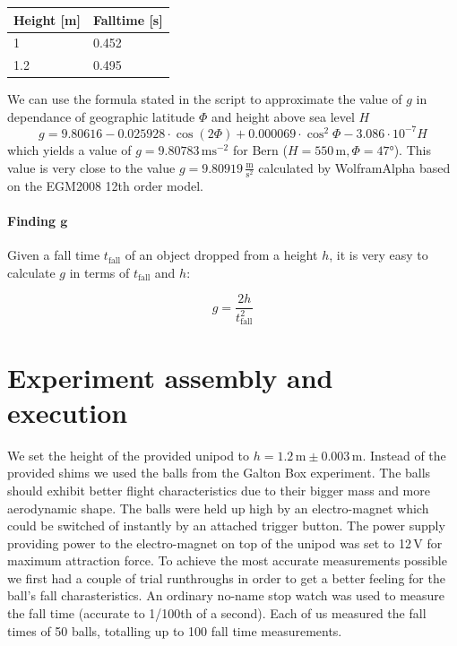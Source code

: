 \documentclass{scrreprt}
\newcommand{\unit}[1]{\ensuremath{\, \mathrm{#1}}}
\begin{document}
\begin{center}
    \begin{tabular}{|l||l|}
    \hline
    Height [m] & Falltime [s]\\ \hline \hline
    1 & 0.452\\ \hline
    1.2 & 0.495\\ \hline
    \end{tabular}
\end{center}

We can use the formula stated in the script \cite[p. 54, f. 4.2]{physcript13} to approximate the value of $g$ in dependance of geographic latitude $\Phi$ and height above sea level $H$
\begin{equation} 
g = 9.80616 - 0.025928 \cdot \cos(2\Phi) + 0 .000069 \cdot \cos^{2} \Phi - 3.086 \cdot 10^{-7} H
\end{equation}
which yields a value of $g = 9.80783\unit{ms^{-2}}$ for Bern ($H = 550\unit{m}, \Phi = \ang{47}$). This value is very close to the value $g = 9.80919\unit{\frac{m}{s^{2}}}$ calculated by WolframAlpha based on the EGM2008 12th order model.\\

\paragraph*{Finding $\mathbf{g}$}
Given a fall time $t_{\text{fall}}$ of an object dropped from a height $h$, it is very easy to calculate $g$ in terms of $t_{\text{fall}}$ and $h$:

\begin{equation} \label{eq:find}
g=\frac{2h}{t_{\text{fall}}^2}
\end{equation}

\section{Experiment assembly and execution}
We set the height of the provided unipod to $h=1.2\unit{m}\pm 0.003\unit{m}$. Instead of the provided shims we used the balls from the Galton Box experiment. The balls should exhibit better flight characteristics due to their bigger mass and more aerodynamic shape. The balls were held up high by an electro-magnet which could be switched of instantly by an attached trigger button. The power supply providing power to the electro-magnet on top of the unipod was set to 12$\unit{V}$ for maximum attraction force. To achieve the most accurate measurements possible we first had a couple of trial runthroughs in order to get a better feeling for the ball's fall charasteristics. An ordinary no-name stop watch was used to measure the fall time (accurate to 1/100th of a second). Each of us measured the fall times of 50 balls, totalling up to 100 fall time measurements.  
\end{document}
